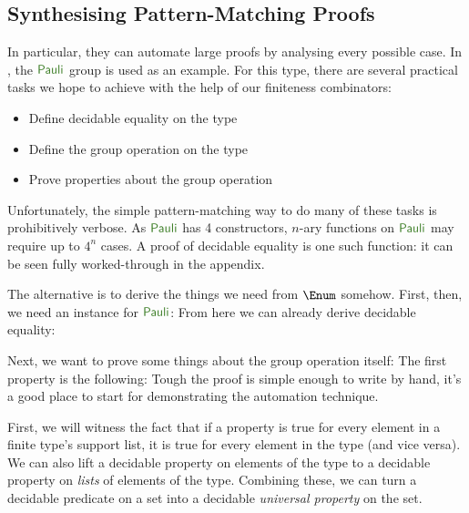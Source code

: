 \subsection{Synthesising Pattern-Matching Proofs}
In particular, they can automate large proofs by analysing every possible case.
In \cite{firsovDependentlyTypedProgramming2015}, the \(\AgdaDatatype{Pauli}\)
group is used as an example.
For this type, there are several practical tasks we hope to achieve with the
help of our finiteness combinators:
\begin{itemize}
  \item Define decidable equality on the type
  \item Define the group operation on the type
  \item Prove properties about the group operation
\end{itemize}
Unfortunately, the simple pattern-matching way to do many of these tasks is
prohibitively verbose.
As \(\AgdaDatatype{Pauli}\) has 4 constructors, \(n\)-ary functions on
\(\AgdaDatatype{Pauli}\) may require up to \(4^n\) cases.
A proof of decidable equality is one such function: it can be seen fully
worked-through in the appendix.

The alternative is to derive the things we need from \(\Enum\) somehow.
First, then, we need an instance for \(\AgdaDatatype{Pauli}\):
From here we can already derive decidable equality:

Next, we want to prove some things about the group operation itself:
The first property is the following:
Tough the proof is simple enough to write by hand, it's a good place to start
for demonstrating the automation technique.

First, we will witness the fact that if a property is true for every element in
a finite type's support list, it is true for every element in the type (and vice
versa).
We can also lift a decidable property on elements of the type to a decidable
property on \emph{lists} of elements of the type.
Combining these, we can turn a decidable predicate on a set into a decidable
\emph{universal property} on the set.

